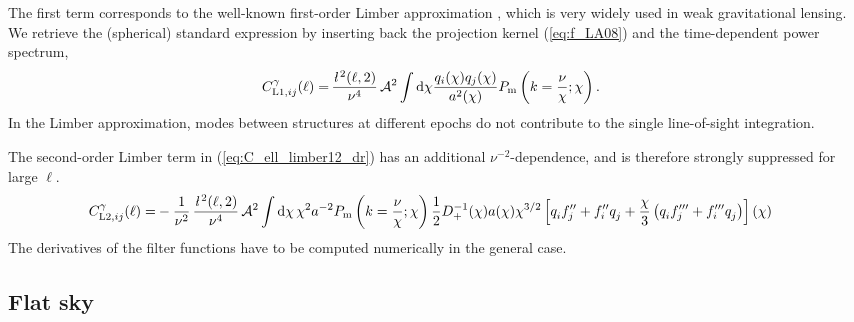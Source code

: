 \documentclass[useAMS,usenatbib]{mn2e} %
\newcommand{\ellbar}{\hbox{\it \l}\,}
\newcommand{\pref}{{\cal A}}
\begin{document}
%
The first term corresponds to the well-known first-order Limber approximation
\cite{1953ApJ...117..134L,1992ApJ...388..272K}, which is very widely used in
weak gravitational lensing. We retrieve the (spherical) standard expression by
inserting back the projection kernel (\ref{eq:f_LA08}) and the time-dependent
power spectrum,
%
\begin{align}
  C^\gamma_{{\rm L1}, ij}(\ell) = & \, \frac{\ellbar^2(\ell, 2)}{\nu^4} \, \pref^2 \int {\rm d} \chi \frac{ q_i(\chi) q_j(\chi) }{a^2(\chi)}
  P_{\rm m}\left(k = \frac{\nu}{\chi}; \chi\right).
  \label{eq:C_ell_limber1}
\end{align}
%
In the Limber approximation, modes between structures at different epochs do
not contribute to the single line-of-sight integration.

The second-order Limber term in (\ref{eq:C_ell_limber12_dr}) has an additional
$\nu^{-2}$-dependence, and is therefore strongly suppressed for large $\ell$.
%
\begin{align}
  C^\gamma_{{\rm L2}, ij}(\ell) = & - \frac 1 {\nu^2} \, \frac{\ellbar^2(\ell, 2)}{\nu^4} \, \pref^2
    \int {\rm d} \chi \, \chi^{2} a^{-2} P_{\rm m}\left(k = \frac\nu\chi; \chi\right)
    \frac 1 2 D^{-1}_+(\chi) a(\chi) \chi^{3/2} \left[ q^{}_i f^{\prime\prime}_j + f^{\prime\prime}_i q^{}_j
      + \frac{\chi}{3} \left( q^{}_i f^{\prime\prime\prime}_j + f^{\prime\prime\prime}_i q^{}_j
      \right)
    \right](\chi)
  \label{eq:C_ell_limber2_dr} 
\end{align}
%
The derivatives of the filter functions have to be computed numerically in the general case.


\subsection{Flat sky}
\end{document}
